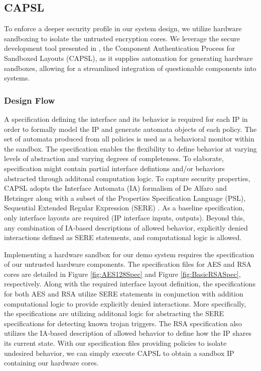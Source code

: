 \documentclass[sigconf]{acmart}
\theoremstyle{plain}
\theoremstyle{remark}
\begin{document}
\subsection{CAPSL}

To enforce a deeper security profile in our system design, we utilize hardware sandboxing to isolate the untrusted encryption cores. We leverage the secure development tool presented in \cite{CAPSL}, the Component Authentication Process for Sandboxed Layouts (CAPSL), as it supplies automation for generating hardware sandboxes, allowing for a streamlined integration of questionable components into systems.

\subsubsection{Design Flow}

A specification defining the interface and its behavior is required for each IP in order to formally model the IP and generate automata objects of each policy. The set of automata produced from all policies is used as a behavioral monitor within the sandbox. The specification enables the flexibility to define behavior at varying levels of abstraction and varying degrees of completeness. To elaborate, specification might contain partial interface defintions and/or behaviors abstracted through additonal computation logic. To capture security properties, CAPSL adopts the Interface Automata (IA) formalism of De Alfaro and Hetzinger \cite{deAlfaro} along with a subset of the Properties Specification Language (PSL), Sequential Extended Regular Expression (SERE) \cite{psl}. As a baseline specification, only interface layouts are required (IP interface inputs, outputs). Beyond this, any combination of IA-based descriptions of allowed behavior, explicitly denied interactions defined as SERE statements, and computational logic is allowed.

Implementing a hardware sandbox for our demo system requires the specification of our untrusted hardware components. The specification files for AES and RSA cores are detailed in Figure \ref{fig:AES128Spec} and Figure \ref{fig:BasicRSASpec}, respectively. Along with the required interface layout definition, the specifications for both AES and RSA utilize SERE statements in conjunction with addition computational logic to provide explicitly denied interactions. More specifically, the specifications are utilizing additonal logic for abstracting the SERE specifications for detecting known trojan triggers. The RSA specification also utilizes the IA-based description of allowed behavior to define how the IP shares its current state. With our specification files providing policies to isolate undesired behavior, we can simply execute CAPSL to obtain a sandbox IP containing our hardware cores.
\end{document}
